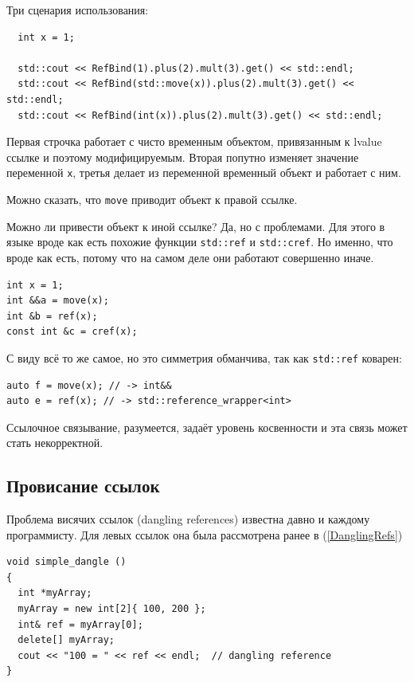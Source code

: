 \documentclass[a4paper,12pt,oneside]{book}
\begin{document}
Три сценария использования:

\begin{lstlisting}
  int x = 1;

  std::cout << RefBind(1).plus(2).mult(3).get() << std::endl;
  std::cout << RefBind(std::move(x)).plus(2).mult(3).get() << std::endl;
  std::cout << RefBind(int(x)).plus(2).mult(3).get() << std::endl;
\end{lstlisting}

Первая строчка работает с чисто временным объектом, привязанным к lvalue ссылке и поэтому модифицируемым. Вторая попутно изменяет значение переменной \lstinline!x!, третья делает из переменной временный объект и работает с ним.

Можно сказать, что \lstinline!move! приводит объект к правой ссылке.

Можно ли привести объект к иной ссылке? Да, но с проблемами. Для этого в языке вроде как есть похожие функции \lstinline!std::ref! и \lstinline!std::cref!. Но именно, что вроде как есть, потому что на самом деле они работают совершенно иначе.

\begin{lstlisting}
int x = 1;
int &&a = move(x);
int &b = ref(x); 
const int &c = cref(x);
\end{lstlisting}

С виду всё то же самое, но это симметрия обманчива, так как \lstinline!std::ref! коварен:

\begin{lstlisting}
auto f = move(x); // -> int&&
auto e = ref(x); // -> std::reference_wrapper<int> 
\end{lstlisting}

Ссылочное связывание, разумеется, задаёт уровень косвенности и эта связь может стать некорректной.

\subsection{Провисание ссылок}\label{subsub:danglingrefs}

Проблема висячих ссылок (dangling references) известна давно и каждому программисту. Для левых ссылок она была рассмотрена ранее в (\ref{DanglingRefs})

\begin{lstlisting}
void simple_dangle ()
{
  int *myArray;
  myArray = new int[2]{ 100, 200 };
  int& ref = myArray[0];
  delete[] myArray;
  cout << "100 = " << ref << endl;  // dangling reference  
}
\end{lstlisting}
\end{document}
